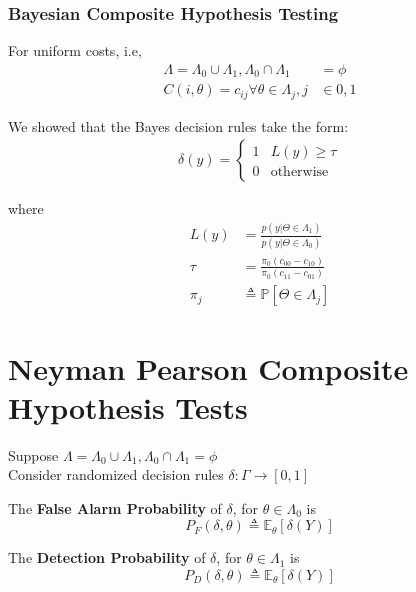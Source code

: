 \documentclass[12pt]{report}
\begin{document}
\subsubsection{Bayesian Composite Hypothesis Testing}

\noindent For uniform costs, i.e,
\begin{align*}
    \Lambda = \Lambda_0 \cup \Lambda_1, \Lambda_0 \cap \Lambda_1 &= \phi \\
    C(i,\theta) = c_{ij} \forall \theta \in \Lambda_j, j &\in {0,1}    
\end{align*}

We showed that the Bayes decision rules take the form:
\begin{align*}
    \delta(y)=\begin{cases}
    1 &L(y) \geq \tau \\
    0 & \text{otherwise}
    \end{cases}
\end{align*}

where
\begin{align*}
    L(y) &= \frac{p(y|\Theta \in \Lambda_1)}{p(y|\Theta \in \Lambda_0)} \\
    \tau &= \frac{\pi_{0}(c_{00}-c_{10})}{\pi_{0}(c_{11}-c_{01})}\\
    \pi_j &\triangleq \mathbb{P}[\Theta \in \Lambda_j]
\end{align*}


\section{Neyman Pearson Composite Hypothesis Tests}

Suppose $\Lambda = \Lambda_0 \cup \Lambda_1, \Lambda_0 \cap \Lambda_1 = \phi $\\
Consider randomized decision rules $\delta: \Gamma \to [0, 1]$

\begin{defn}
The \textbf{False Alarm Probability} of $\delta$, for $\theta \in \Lambda_0$ is
\begin{equation}
    P_F(\delta,\theta) \triangleq \mathbb{E}_{\theta}[\delta(Y)]
\end{equation}    


\end{defn}

\begin{defn}
The \textbf{Detection Probability} of $\delta$, for $\theta \in \Lambda_1$ is
\begin{equation}
    P_D(\delta,\theta) \triangleq \mathbb{E}_{\theta}[\delta(Y)]
\end{equation}    


\end{defn}
\end{document}
